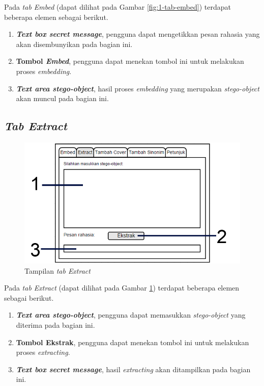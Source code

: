 Pada \textit{tab Embed} (dapat dilihat pada Gambar \ref{fig:1-tab-embed}) terdapat beberapa elemen sebagai berikut.

\begin{enumerate}
	\item \textbf{\textit{Text box secret message}}, pengguna dapat mengetikkan pesan rahasia yang akan disembunyikan pada bagian ini.
	\item \textbf{Tombol \textit{Embed}}, pengguna dapat menekan tombol ini untuk melakukan proses \textit{embedding}.
	\item \textbf{\textit{Text area stego-object}}, hasil proses \textit{embedding} yang merupakan \textit{stego-object} akan muncul pada bagian ini.
\end{enumerate}

\subsection{\textit{Tab Extract}}

\begin{figure}[H]
	\centering
	\includegraphics[scale=1.8]{Gambar/tab-extract}
	\caption{Tampilan \textit{tab Extract}} 
	\label{fig:2-tab-extract}
\end{figure}

Pada \textit{tab Extract} (dapat dilihat pada Gambar \ref{fig:2-tab-extract}) terdapat beberapa elemen sebagai berikut.

\begin{enumerate}
	\item \textbf{\textit{Text area stego-object}}, pengguna dapat memasukkan \textit{stego-object} yang diterima pada bagian ini.
	\item \textbf{Tombol Ekstrak}, pengguna dapat menekan tombol ini untuk melakukan proses \textit{extracting}.
	\item \textbf{\textit{Text box secret message}}, hasil \textit{extracting} akan ditampilkan pada bagian ini.
\end{enumerate} 

